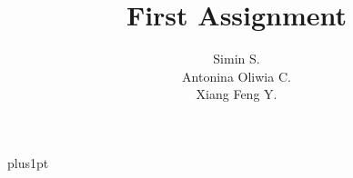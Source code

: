 \documentclass[11pt]{ociamthesis}
\title{First Assignment}
\author{Simin S. \\ Antonina Oliwia C. \\ Xiang Feng Y.}
\begin{document}
\baselineskip=18pt plus1pt

\setcounter{secnumdepth}{3}
\setcounter{tocdepth}{2}

\maketitle

\begin{romanpages}          %
\tableofcontents
\end{romanpages}            %





\startappendix


\clearpage

\end{document}
